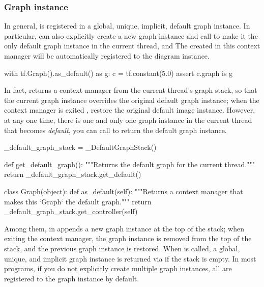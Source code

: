 \begin{content}
\subsubsection{Graph instance}
In general,  is registered in a global, unique, implicit, default graph instance. In particular, \tf{} can also explicitly create a new graph instance  and call  to make it the only default graph instance in the current thread, and The  created in this context manager will be automatically registered to the diagram instance.

\begin{leftbar}
\begin{python}
with tf.Graph().as_default() as g:
  c = tf.constant(5.0)
  assert c.graph is g
\end{python}
\end{leftbar}

In fact,  returns a context manager from the current thread's graph stack, so that the current graph instance  overrides the original default graph instance; when the context manager is exited , restore the original default image instance. However, at any one time, there is one and only one graph instance in the current thread that becomes \emph{default}, you can call  to return the default graph instance.

\begin{leftbar}
\begin{python}
_default_graph_stack = _DefaultGraphStack()

def get_default_graph():
  """Returns the default graph for the current thread."""
  return _default_graph_stack.get_default()

class Graph(object):
  def as_default(self):
    """Returns a context manager that makes this `Graph` the default graph."""
    return _default_graph_stack.get_controller(self)
\end{python}
\end{leftbar}

Among them,  in  appends a new graph instance at the top of the stack; when exiting the context manager, the graph instance is removed from the top of the stack, and the previous graph instance is restored. When  is called, a global, unique, and implicit graph instance is returned via  if the stack is empty. In most \tf{} programs, if you do not explicitly create multiple graph instances, all  are registered to the graph instance by default.


\end{content}
